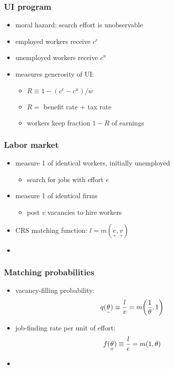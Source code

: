 \documentclass[12pt,xcolor={dvipsnames},hyperref={pdftex,pdfpagemode=UseNone,hidelinks,pdfdisplaydoctitle=true},usepdftitle=false]{beamer}
\begin{document}
\begin{frame}
\end{frame}

\begin{frame}
\frametitle{UI program}
\begin{itemize}
\item moral hazard: search effort is unobservable
\item employed workers receive $c^{e}$ 
\item unemployed workers receive $c^{u}$
\item {} measures generosity of UI:
\begin{itemize}
\item $R\equiv 1-(c^{e}-c^{u})/w$
\item $R=$ benefit rate + tax rate
\item workers keep fraction $1-R$ of earnings
\end{itemize}
\end{itemize}
\end{frame}

\begin{frame}
\frametitle{Labor market}
\begin{itemize}
\item measure 1 of identical workers, initially unemployed
\begin{itemize}
\item search for jobs with effort $e$
\end{itemize}
\item measure 1 of identical firms
\begin{itemize}
\item post $v$ vacancies to hire workers
\end{itemize}
\item CRS matching function: $l=m(\underset{+}{e},\underset{+}{v})$
\item {}
\end{itemize}
\end{frame}

\begin{frame}
\frametitle{Matching probabilities}
\begin{itemize}
\item vacancy-filling probability:
\begin{align*}
q(\underset{-}{\theta})\equiv \frac{l}{v}= m{\left( \frac{1}{\theta},1 \right)}
\end{align*}
\item job-finding rate per unit of effort: 
\begin{align*}
f(\underset{+}{\theta})\equiv \frac{l}{e} =  m{\left( 1,\theta \right)}
\end{align*}
\item {}
\end{itemize}
\end{frame}
\end{document}
